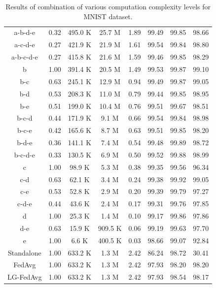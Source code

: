\documentclass{article} %
\begin{document}
\begin{table}[hbtp]
{\begin{tabular}{@{}cccccccc@{}}
a-b-d-e    & 0.32 & 495.0 K & 25.7 M  & 1.89 & 99.49                & 99.85        & 98.66        \\
a-c-d-e    & 0.27 & 421.9 K & 21.9 M  & 1.61 & 99.54                & 99.84        & 98.80        \\
a-b-c-d-e  & 0.27 & 415.8 K & 21.6 M  & 1.59 & 99.46                & 99.85        & 98.29        \\
b          & 1.00 & 391.4 K & 20.5 M  & 1.49 & 99.53                & 99.87        & 99.10        \\
b-c        & 0.63 & 245.1 K & 12.9 M  & 0.94 & 99.49                & 99.87        & 99.05        \\
b-d        & 0.53 & 208.3 K & 11.0 M  & 0.79 & 99.44                & 99.85        & 98.95        \\
b-e        & 0.51 & 199.0 K & 10.4 M  & 0.76 & 99.51                & 99.67        & 98.51        \\
b-c-d      & 0.44 & 171.9 K & 9.1 M   & 0.66 & 99.54                & 99.84        & 98.98        \\
b-c-e      & 0.42 & 165.6 K & 8.7 M   & 0.63 & 99.51                & 99.85        & 98.20        \\
b-d-e      & 0.36 & 141.1 K & 7.4 M   & 0.54 & 99.48                & 99.89        & 98.72        \\
b-c-d-e    & 0.33 & 130.5 K & 6.9 M   & 0.50 & 99.52                & 99.88        & 98.99        \\
c          & 1.00 & 98.9 K  & 5.3 M   & 0.38 & 99.35                & 99.56        & 96.34        \\
c-d        & 0.63 & 62.1 K  & 3.4 M   & 0.24 & 99.38                & 99.92        & 99.05        \\
c-e        & 0.53 & 52.8 K  & 2.9 M   & 0.20 & 99.39                & 99.79        & 97.27        \\
c-d-e      & 0.44 & 43.6 K  & 2.4 M   & 0.17 & 99.31                & 99.76        & 97.85        \\
d          & 1.00 & 25.3 K  & 1.4 M   & 0.10 & 99.17                & 99.86        & 97.86        \\
d-e        & 0.63 & 15.9 K  & 909.5 K & 0.06 & 99.19                & 99.63        & 97.70        \\
e          & 1.00 & 6.6 K   & 400.5 K & 0.03 & 98.66                & 99.07        & 92.84        \\ \midrule
Standalone \citep{liang2020think}& 1.00 & 633.2 K & 1.3 M   & 2.42 & 86.24                & 98.72        & 30.41        \\
FedAvg     \citep{liang2020think}& 1.00 & 633.2 K & 1.3 M   & 2.42 & 97.93                & 98.20        & 98.20        \\
LG-FedAvg  \citep{liang2020think}& 1.00 & 633.2 K & 1.3 M   & 2.42 & 97.93                & 98.54        & 98.17        \\ \bottomrule
\end{tabular}
}
\caption{Results of combination of various computation complexity levels for MNIST dataset.}
\label{tab:MNIST_appendix}
\end{table}
\end{document}
